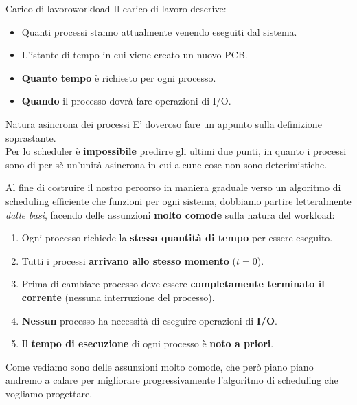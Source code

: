 \documentclass[12pt]{report}
\begin{document}
	\begin{definizione}{Carico di lavoro}{workload}
		Il carico di lavoro descrive:
		\begin{itemize}
			\item Quanti processi stanno attualmente venendo eseguiti dal sistema.
			
			\item L'istante di tempo in cui viene creato un nuovo PCB.
			
			\item \textbf{Quanto tempo} è richiesto per ogni processo.
			
			\item \textbf{Quando} il processo dovrà fare operazioni di I/O.
		\end{itemize}
	\end{definizione}
	
	\begin{osservazione}{Natura asincrona dei processi}{}
		E' doveroso fare un appunto sulla definizione soprastante.\\
		Per lo scheduler è \textbf{impossibile} predirre gli ultimi due punti, in quanto i processi sono di per sè un'unità asincrona in cui alcune cose non sono deterimistiche.
	\end{osservazione}
	
	Al fine di costruire il nostro percorso in maniera graduale verso un algoritmo di scheduling efficiente che funzioni per ogni sistema, dobbiamo partire letteralmente \textit{dalle basi}, facendo delle assunzioni \textbf{molto comode} sulla natura del workload:
	\begin{enumerate}
		\item Ogni processo richiede la \textbf{stessa quantità di tempo} per essere eseguito.
		
		\item Tutti i processi \textbf{arrivano allo stesso momento} ($t = 0$).
		
		\item Prima di cambiare processo deve essere \textbf{completamente terminato il corrente} (nessuna interruzione del processo).
		
		\item \textbf{Nessun} processo ha necessità di eseguire operazioni di \textbf{I/O}.
		
		\item Il \textbf{tempo di esecuzione} di ogni processo è \textbf{noto a priori}.
	\end{enumerate}
	Come vediamo sono delle assunzioni molto comode, che però piano piano andremo a calare per migliorare progressivamente l'algoritmo di scheduling che vogliamo progettare.
	\smallbreak
	
\end{document}
